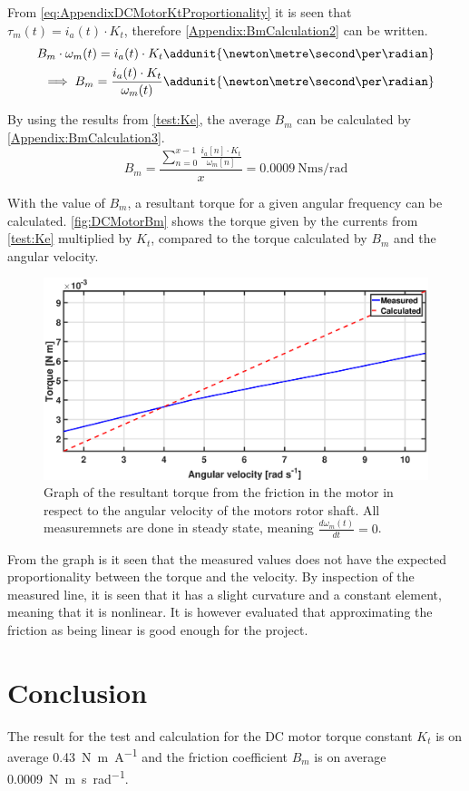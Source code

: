 From \autoref{eq:AppendixDCMotorKtProportionality} it is seen that $\tau_m(t) = i_a(t) \cdot K_t$, therefore \autoref{Appendix:BmCalculation2} can be written. 
\begin{subequations}
\begin{align}
B_m \cdot \omega_{m}(t)=i_a(t) \cdot K_t 	\addunit{\newton\metre\second\per\radian}\label{Appendix:BmCalculation2} \\
\implies B_m =\frac{i_a(t) \cdot K_t}{\omega_{m}(t)} \addunit{\newton\metre\second\per\radian} \label{Appendix:BmCalculation2.5}
\end{align}
\end{subequations} 

By using the results from \autoref{test:Ke}, the average $B_m$ can be calculated by \autoref{Appendix:BmCalculation3}.
\begin{equation}
B_m = \frac{\sum\limits_{n=0}^{x-1} \frac{i_{a}[n]\cdot K_t}{\omega_{m}[n]}}{x}=\SI{0.0009}{\newton\metre\second\per\radian}\label{Appendix:BmCalculation3}
\end{equation}

With the value of $B_m$, a resultant torque for a given angular frequency can be calculated. \autoref{fig:DCMotorBm} shows the torque given by the currents from \autoref{test:Ke} multiplied by $K_t$, compared to the torque calculated by $B_m$ and the angular velocity.
\begin{figure}[!h]
\centering
\includegraphics[width=\textwidth]{figures/test/MotorFrictionCoefficient}
\caption{Graph of the resultant torque from the friction in the motor in respect to the angular velocity of the motors rotor shaft. All measuremnets are done in steady state, meaning $\frac{d \omega_{m}(t)}{d t} = 0$.}\label{fig:DCMotorBm}
\end{figure}

From the graph is it seen that the measured values does not have the expected proportionality between the torque and the velocity. By inspection of the measured line, it is seen that it has a slight curvature and a constant element, meaning that it is nonlinear. It is however evaluated that approximating the friction as being linear is good enough for the project.

\newpage
\section*{Conclusion}
The result for the test and calculation for the DC motor torque constant $K_t$ is on average \SI{0.43}{\newton\metre\per\ampere} and the friction coefficient $B_m$ is on average \SI{0.0009}{\newton\metre\second\per\radian}.